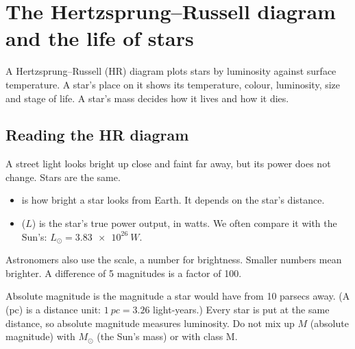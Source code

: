 \section{The Hertzsprung--Russell diagram and the life of stars}\label{ch1:sec:hr}

\begin{bigidea}
A Hertzsprung--Russell (HR) diagram plots stars by luminosity against surface
temperature. A star's place on it shows its temperature, colour, luminosity, size and
stage of life. A star's mass decides how it lives and how it dies.
\end{bigidea}

\begin{keywords}
\end{keywords}

\subsection{Reading the HR diagram}
A street light looks bright up close and faint far away, but its power does not change.
Stars are the same.
\begin{itemize}
  \item {} is how bright a star looks from Earth. It depends on
        the star's distance.
  \item {} ($L$) is the star's true power output, in watts. We often
        compare it with the Sun's: $L_\odot = \qty{3.83e26}{W}$.
\end{itemize}

Astronomers also use the  scale, a number for brightness. Smaller
numbers mean brighter. A difference of 5 magnitudes is a factor of 100.

Absolute magnitude is the magnitude a star would have from 10 parsecs away. (A
 (pc) is a distance unit: $\qty{1}{pc} = 3.26$ light-years.) Every star is
put at the same distance, so absolute magnitude measures luminosity. Do not mix up $M$
(absolute magnitude) with $M_\odot$ (the Sun's mass) or with class M.

